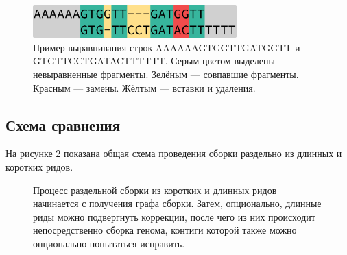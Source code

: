 \documentclass[14pt]{matmex-diploma-custom}
\begin{document}
\begin{figure}[h]
    \centering
    \includegraphics[width=0.7\textwidth]{alignment.eps}
    \caption{Пример выравнивания строк AAAAAAGTGGTTGATGGTT и GTGTTCCTGATACTTTTTT. Серым цветом выделены невыравненные фрагменты. Зелёным --- совпавшие фрагменты. Красным --- замены. Жёлтым --- вставки и удаления. }
    \label{fig:alignment}
\end{figure}

\subsection{Схема сравнения}
На рисунке \ref{fig:common_pipeline} показана общая схема проведения сборки раздельно из длинных и коротких ридов.

\begin{figure}[h]
    \centering
{}
\caption{Процесс раздельной сборки из коротких и длинных ридов начинается с получения графа сборки. Затем, опционально, длинные риды можно подвергнуть коррекции, после чего из них происходит непосредственно сборка генома, контиги которой также можно опционально попытаться исправить.}
\label{fig:common_pipeline}
\end{figure}
\end{document}
